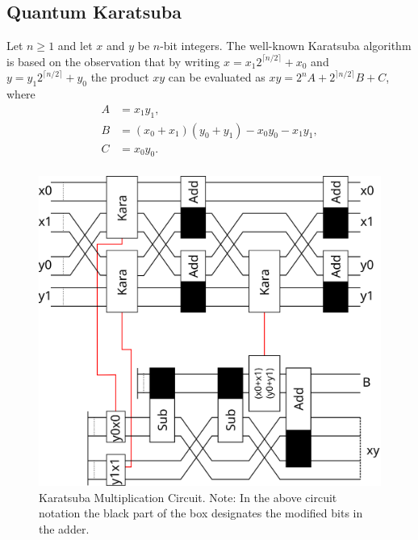 \subsection{Quantum Karatsuba}
    Let $n\geq 1$ and let $x$ and $y$ be $n$-bit integers. 
    The well-known Karatsuba\cite{KO:1963} algorithm is based on the observation that by writing $x=x_1 2^{\lceil n/2\rceil}+x_0$ and $y=y_1 2^{\lceil n/2\rceil }+y_0$ the product $xy$ can be evaluated as $xy=2^n A + 2^{\rceil n/2 \rceil} B + C$, where 
    \begin{align*}
      A &= x_1 y_1, \\
      B &= (x_0+x_1)(y_0+y_1) - x_0 y_0 - x_1 y_1,\\
      C &= x_0 y_0. \\
    \end{align*}
    \begin{figure}[ht]
      \capstart
      \centering
      \includegraphics[width=2\textwidth/3]{images/karatsuba2} 
      \caption{Karatsuba Multiplication Circuit.
               Note: In the above circuit notation the black part of the box designates the modified bits in the adder.}
      \label{fig:kara2}
     \end{figure}
